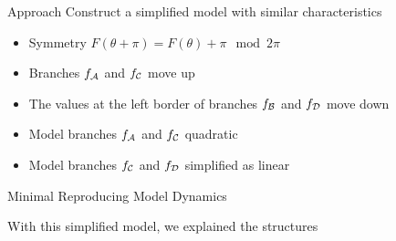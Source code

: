\begin{frame}{Approach}
	\vspace{-1em}
	Construct a simplified model with similar characteristics
	\pause
	\begin{itemize}
		\item Symmetry $F(\theta + \pi) = F(\theta) + \pi \mod 2\pi$ \hfill \cite{akyuz2022} \pause
		\item Branches $f_{\mathcal{A}}$ and $f_{\mathcal{C}}$ move up \pause
		\item The values at the left border of branches $f_{\mathcal{B}}$ and $f_{\mathcal{D}}$ move down \pause
		\item Model branches $f_{\mathcal{A}}$ and $f_{\mathcal{C}}$ quadratic \pause
		\item Model branches $f_{\mathcal{C}}$ and $f_{\mathcal{D}}$ simplified as linear
	\end{itemize}

	\begin{figure}
	\end{figure}
\end{frame}

\begin{frame}{Minimal Reproducing Model Dynamics}
	\vspace{-1em}
	\begin{figure}
		\qquad
	\end{figure}
	With this simplified model, we explained the structures
\end{frame}

